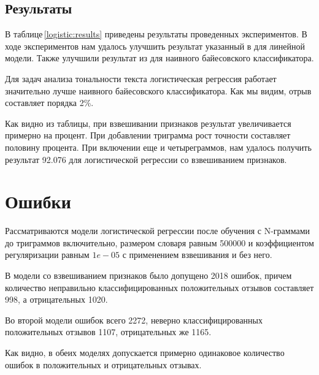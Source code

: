 \subsection{Результаты}
В таблице\,\ref{logistic:results} приведены результаты проведенных экспериментов. В ходе экспериментов нам удалось улучшить результат указанный в \cite{ensemble:GregoireMesnil} для линейной модели. Также улучшили результат из \cite{Narayanan:naiveBayes} для наивного байесовского классификатора.

Для задач анализа тональности текста логистическая регрессия работает значительно лучше наивного байесовского классификатора. Как мы видим, отрыв составляет порядка 2\%.

Как видно из таблицы, при взвешивании признаков результат увеличивается примерно на процент. При добавлении триграмма рост точности составляет половину процента. При включении еще и четыреграммов, нам удалось получить результат 92.076 для логистической регрессии со взвешиванием признаков.

\section{Ошибки}
Рассматриваются модели логистической регрессии после обучения с N-граммами до триграммов включительно, размером словаря равным 500000 и коэффициентом регуляризации равным $1e-05$ с применением взвешивания и без него.

В модели со взвешиванием признаков было допущено 2018 ошибок, причем количество неправильно классифицированных положительных отзывов составляет 998, а отрицательных 1020.

Во второй модели ошибок всего 2272, неверно классифицированных положительных отзывов 1107, отрицательных же 1165.

Как видно, в обеих моделях допускается примерно одинаковое количество ошибок в положительных и отрицательных отзывах.

